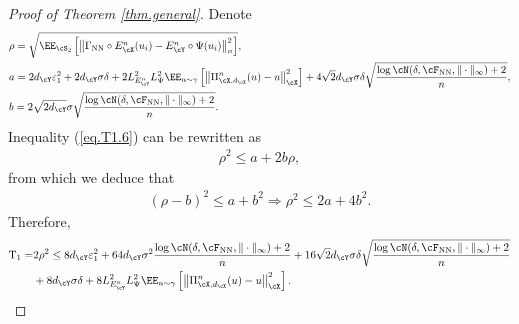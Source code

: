 \documentclass[11pt]{article} %
\begin{document}
\begin{proof}[Proof of Theorem \ref{thm.general}]
 Denote 
 \begin{align*}
 	&\rho=\sqrt{\EE_{\cS_2}\left[\left\| \Gamma_{\rm NN} \circ E_{\cX}^n(u_i)- E_{\cY}^n\circ\Psi(u_i)\right\|_{n}^2\right]},\\
 	&a=2d_{\cY}\varepsilon_1^2+ 2d_{\cY}\sigma\delta+ 2L_{E^n_{\cY}}^2L_{\Psi}^2\EE_{u\sim \gamma}\left[ \left\| \Pi_{\cX,d_{\cX}}^n(u)- u\right\|_{\cX}^2\right] + 4\sqrt{2}d_{\cY}\sigma\delta \sqrt{\frac{\log \cN(\delta,\cF_{\rm NN}, \|\cdot\|_{\infty}) +2}{n}}  ,\\
 	&b=2\sqrt{2d_{\cY}}\sigma\sqrt{\frac{\log \cN(\delta,\cF_{\rm NN}, \|\cdot\|_{\infty}) +2}{n}}.
 \end{align*}
 Inequality (\ref{eq.T1.6}) can be rewritten as
 \begin{align*}
 	\rho^2\leq a+2b\rho,
 \end{align*}
 from which we deduce that
 \begin{align*}
 	(\rho-b)^2\leq a+b^2\Rightarrow \rho^2\leq 2a+4b^2.
 \end{align*}
 Therefore, 
 \begin{align}
 	{\rm T_1}=&2\rho^2\leq 8d_{\cY}\varepsilon_1^2+64d_{\cY}\sigma^2\frac{\log \cN(\delta,\cF_{\rm NN}, \|\cdot\|_{\infty}) +2}{n} + 16\sqrt{2}d_{\cY}\sigma\delta \sqrt{\frac{\log \cN(\delta,\cF_{\rm NN}, \|\cdot\|_{\infty}) +2}{n}}\nonumber\\& +8d_{\cY}\sigma\delta +8L_{E^n_{\cY}}^2L_{\Psi}^2\EE_{u\sim \gamma} \left[ \left\| \Pi_{\cX,d_{\cX}}^n(u)- u\right\|_{\cX}^2\right].
 	\label{eq.T1}
 \end{align}
 

\end{proof}
\end{document}
